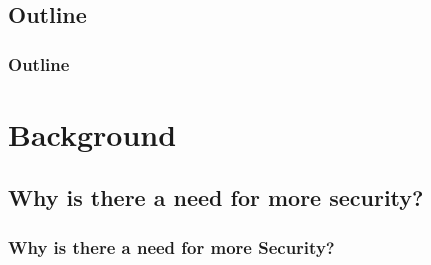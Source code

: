 \documentclass{beamer}
\newcommand{\linespace}{\vskip 0.25cm}
\begin{document}
\subsection*{Outline}

\begin{frame}
  \frametitle{Outline}
  \tableofcontents[hideallsubsections]
\end{frame}

\section[Mobile Security]{Background}

\subsection{Why is there a need for more security?}

\begin{frame}
  \frametitle{Why is there a need for more Security?}
%  
%
%
%
%  

\end{frame}

%
%	
%	
%	
%	
%	
%	
%	
\end{document}

